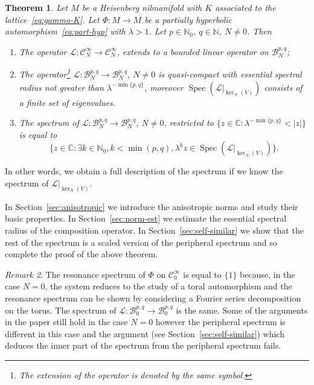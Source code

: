 \documentclass[a4paper,11pt]{amsart}
\newtheorem{theorem}{Theorem}[section]
\theoremstyle{remark}
\newtheorem{remark}[theorem]{Remark}
\newcommand{\abs}[1]{\left|#1\right|} %
\newcommand{\cB}{\mathcal{B}} %
\newcommand{\cC}{\mathcal{C}} %
\newcommand{\bC}{\mathbb{C}} %
\newcommand{\cL}{\mathcal{L}} %
\newcommand{\bN}{\mathbb{N}} %
\newcommand{\dv}{V} %
\newcommand{\spec}[1]{\operatorname{Spec}(#1)} %
\begin{document}
\begin{theorem}
    \label{thm:spectrum}
    Let \(M\) be a Heisenberg nilmanifold with \(K\) associated to the lattice~\eqref{eq:gamma-K}.
    Let \(\Phi : M \to M\) be a partially hyperbolic automorphism~\eqref{eq:part-hyp} with \(\lambda > 1\).
    Let \(p \in \bN_0\), \(q \in \bN\), \(N \neq 0\).
    Then
    \begin{enumerate} 
        \item The operator \(\cL : \cC_{N}^\infty \to \cC_{N}^\infty\), extends to a bounded linear operator on \(\cB_{N}^{p,q}\);
        \item The operator\footnote{The extension of the operator is denoted by the same symbol.} \(\cL : \cB_{N}^{p,q} \to \cB_{N}^{p,q}\), \(N\neq 0\) is quasi-compact with essential spectral radius not greater than \(\lambda^{-\min{\{p,q\}}}\), moreover \(\spec{{\left.\cL\right|}_{\ker_N(\dv)}}\) consists of a finite set of eigenvalues.       
        \item The spectrum of \(\cL : \cB_{N}^{p,q} \to \cB_{N}^{p,q}\), \(N\neq 0\), restricted to \(\{z\in \bC: \lambda^{-\min{\{p,q\}}} < \abs{z}\}\) is equal to 
        \[
          \{z\in \bC : \exists k \in \bN_{0}, k < \min(p,q), \lambda^k z \in \spec{{\left.\cL\right|}_{\ker_N(\dv)}} \}.
        \]
    \end{enumerate}
\end{theorem}

In other words, we obtain a full description of the spectrum if we know the spectrum of \({\left.\cL\right|}_{\ker_N(\dv)}\). 

In Section~\ref{sec:anisotropic} we introduce the anisotropic norms and study their basic properties.
In Section~\ref{sec:norm-est} we estimate the essential spectral radius of the composition operator. 
In Section~\ref{sec:self-similar} we show that the rest of the spectrum is a scaled version of the peripheral spectrum and so complete the proof of the above theorem. 

\begin{remark}
    \label{rem:N-is-zero}
    The resonance spectrum of \(\Phi\) on \(\cC^{\infty}_{0}\) is equal to \(\{1\}\) because, in the case \(N=0\), the system reduces to the study of a toral automorphism and the resonance spectrum can be shown by considering a Fourier series decomposition on the torus.
    The spectrum of \(\cL : \cB_{0}^{p,q} \to \cB_{0}^{p,q}\) is the same. 
    Some of the arguments in the paper still hold in the case \(N=0\) however the peripheral spectrum is different in this case and the argument (see Section~\ref{sec:self-similar}) which deduces the inner part of the spectrum from the peripheral spectrum fails.
\end{remark}
\end{document}
